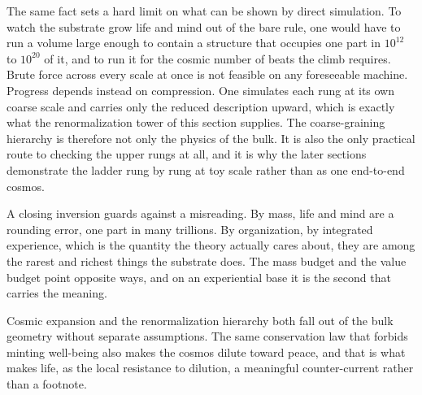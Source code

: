 The same fact sets a hard limit on what can be shown by direct simulation. To watch the substrate grow life and mind out of the bare rule, one would have to run a volume large enough to contain a structure that occupies one part in $10^{12}$ to $10^{20}$ of it, and to run it for the cosmic number of beats the climb requires. Brute force across every scale at once is not feasible on any foreseeable machine. Progress depends instead on compression. One simulates each rung at its own coarse scale and carries only the reduced description upward, which is exactly what the renormalization tower of this section supplies. The coarse-graining hierarchy is therefore not only the physics of the bulk. It is also the only practical route to checking the upper rungs at all, and it is why the later sections demonstrate the ladder rung by rung at toy scale rather than as one end-to-end cosmos.

A closing inversion guards against a misreading. By mass, life and mind are a rounding error, one part in many trillions. By organization, by integrated experience, which is the quantity the theory actually cares about, they are among the rarest and richest things the substrate does. The mass budget and the value budget point opposite ways, and on an experiential base it is the second that carries the meaning.


Cosmic expansion and the renormalization hierarchy both fall out of the bulk geometry without separate assumptions. The same conservation law that forbids minting well-being also makes the cosmos dilute toward peace, and that is what makes life, as the local resistance to dilution, a meaningful counter-current rather than a footnote.
